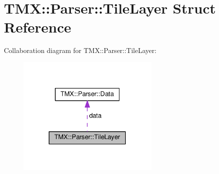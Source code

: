 \hypertarget{struct_t_m_x_1_1_parser_1_1_tile_layer}{}\section{T\+MX\+:\+:Parser\+:\+:Tile\+Layer Struct Reference}
\label{struct_t_m_x_1_1_parser_1_1_tile_layer}


Collaboration diagram for T\+MX\+:\+:Parser\+:\+:Tile\+Layer\+:\nopagebreak
\begin{figure}[H]
\begin{center}
\leavevmode
\includegraphics[width=198pt]{struct_t_m_x_1_1_parser_1_1_tile_layer__coll__graph}
\end{center}
\end{figure}
